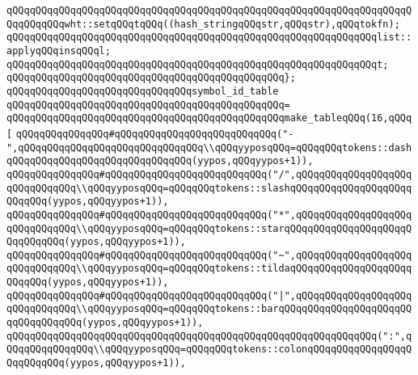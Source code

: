 \verb|qQQqqQQqqQQqqQQqqQQqqQQqqQQqqQQqqQQqqQQqqQQqqQQqqQQqqQQqqQQqqQQqqQQqqQQqqQQqqQQqwht::setqQQqtqQQq((hash_stringqQQqstr,qQQqstr),qQQqtokfn);|\newline
\newline
\verb|qQQqqQQqqQQqqQQqqQQqqQQqqQQqqQQqqQQqqQQqqQQqqQQqqQQqqQQqqQQqqQQqlist::applyqQQqinsqQQql;|\newline
\verb|qQQqqQQqqQQqqQQqqQQqqQQqqQQqqQQqqQQqqQQqqQQqqQQqqQQqqQQqqQQqqQQqt;|\newline
\verb|qQQqqQQqqQQqqQQqqQQqqQQqqQQqqQQqqQQqqQQqqQQqqQQq};|\newline
\newline
\verb|qQQqqQQqqQQqqQQqqQQqqQQqqQQqqQQqsymbol_id_table|\newline
\verb|qQQqqQQqqQQqqQQqqQQqqQQqqQQqqQQqqQQqqQQqqQQqqQQq=|\newline
\verb|qQQqqQQqqQQqqQQqqQQqqQQqqQQqqQQqqQQqqQQqqQQqqQQqmake_tableqQQq(16,qQQq[|\newline
\verb|qQQqqQQqqQQqqQQq#qQQqqQQqqQQqqQQqqQQqqQQqqQQq("-",qQQqqQQqqQQqqQQqqQQqqQQqqQQqqQQq\\qQQqyyposqQQq=qQQqqQQqtokens::dashqQQqqQQqqQQqqQQqqQQqqQQqqQQqqQQq(yypos,qQQqyypos+1)),|\newline
\verb|qQQqqQQqqQQqqQQq#qQQqqQQqqQQqqQQqqQQqqQQqqQQq("/",qQQqqQQqqQQqqQQqqQQqqQQqqQQqqQQq\\qQQqyyposqQQq=qQQqqQQqtokens::slashqQQqqQQqqQQqqQQqqQQqqQQqqQQq(yypos,qQQqyypos+1)),|\newline
\verb|qQQqqQQqqQQqqQQq#qQQqqQQqqQQqqQQqqQQqqQQqqQQq("*",qQQqqQQqqQQqqQQqqQQqqQQqqQQqqQQq\\qQQqyyposqQQq=qQQqqQQqtokens::starqQQqqQQqqQQqqQQqqQQqqQQqqQQqqQQq(yypos,qQQqyypos+1)),|\newline
\verb|qQQqqQQqqQQqqQQq#qQQqqQQqqQQqqQQqqQQqqQQqqQQq("~",qQQqqQQqqQQqqQQqqQQqqQQqqQQqqQQq\\qQQqyyposqQQq=qQQqqQQqtokens::tildaqQQqqQQqqQQqqQQqqQQqqQQqqQQq(yypos,qQQqyypos+1)),|\newline
\verb|qQQqqQQqqQQqqQQq#qQQqqQQqqQQqqQQqqQQqqQQqqQQq("|\verb#|",qQQqqQQqqQQqqQQqqQQqqQQqqQQqqQQq\\qQQqyyposqQQq=qQQqqQQqtokens::barqQQqqQQqqQQqqQQqqQQqqQQqqQQqqQQqqQQq(yypos,qQQqyypos+1)),#\newline
\verb|qQQqqQQqqQQqqQQqqQQqqQQqqQQqqQQqqQQqqQQqqQQqqQQqqQQqqQQqqQQqqQQq(":",qQQqqQQqqQQqqQQq\\qQQqyyposqQQq=qQQqqQQqtokens::colonqQQqqQQqqQQqqQQqqQQqqQQqqQQq(yypos,qQQqyypos+1)),|\newline
